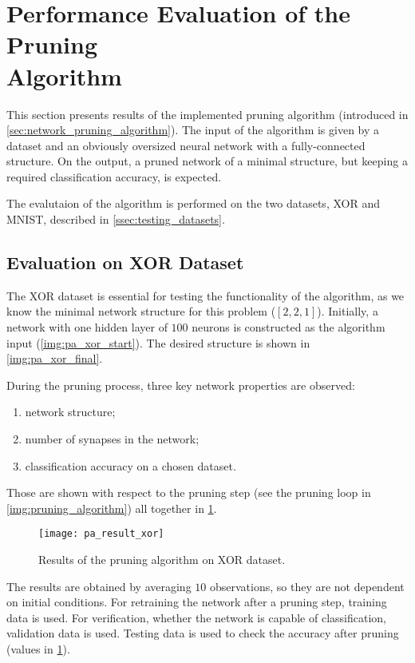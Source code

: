 \section[Performance Evaluation of the Pruning Algorithm]{Performance Evaluation of the Pruning \\Algorithm} \label{sec:pruning_algorithm_results}
This section presents results of the implemented pruning algorithm (introduced in \cref{sec:network_pruning_algorithm}). The input of the algorithm is given by a dataset and an obviously oversized neural network with a fully-connected structure. On the output, a pruned network of a minimal structure, but keeping a required classification accuracy, is expected.

The evalutaion of the algorithm is performed on the two datasets, XOR and MNIST, described in \cref{ssec:testing_datasets}.

\subsection{Evaluation on XOR Dataset} \label{ssec:evaluation_on_xor}
The XOR dataset is essential for testing the functionality of the algorithm, as we know the minimal network structure for this problem ($ [2, 2, 1] $). Initially, a network with one hidden layer of $ 100 $ neurons is constructed as the algorithm input (\cref{img:pa_xor_start}). The desired structure is shown in \cref{img:pa_xor_final}.

During the pruning process, three key network properties are observed:
\begin{enumerate}
\item network structure;
\item number of synapses in the network;
\item classification accuracy on a chosen dataset.
\end{enumerate}

Those are shown with respect to the pruning step (see the pruning loop in \cref{img:pruning_algorithm}) all together in \cref{fig:pa_result_xor}.

\begin{figure}[H]
  \centering
  \texttt{[image: pa\_result\_xor]}
  \caption{Results of the pruning algorithm on XOR dataset.}
  \label{fig:pa_result_xor}
\end{figure}

The results are obtained by averaging $ 10 $ observations, so they are not dependent on initial conditions. For retraining the network after a pruning step, training data is used. For verification, whether the network is capable of classification, validation data is used. Testing data is used to check the accuracy after pruning (values in \cref{fig:pa_result_xor}).

